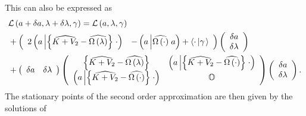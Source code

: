 \documentclass[aps,preprint]{revtex4}%
\begin{document}
This can also be expressed as
\begin{align}
&  \mathcal{L}\left(  a+\delta a,\lambda+\delta\lambda,\gamma\right)
=\mathcal{L}\left(  a,\lambda,\gamma\right) \nonumber\\
&  +\left(
\begin{array}
[c]{cc}%
2\left(  a\left\vert \left\{  \widehat{K+V_{2}}-\widehat{\Omega\left(
\lambda\right)  }\right\}  \right.  \cdot\right)  & -\left(  a\left\vert
\widehat{\Omega\left(  \cdot\right)  }\right.  a\right)  +\left\langle
\cdot\left\vert \gamma\right.  \right\rangle
\end{array}
\right)  \left(
\begin{array}
[c]{c}%
\delta a\\
\delta\lambda
\end{array}
\right) \nonumber\\
&  +\left(
\begin{array}
[c]{cc}%
\delta a & \delta\lambda
\end{array}
\right)  \left(
\begin{array}
[c]{cc}%
\left\{  \widehat{K+V_{2}}-\widehat{\Omega\left(  \lambda\right)  }\right\}  &
\left(  a\left\vert \left\{  \widehat{K+V_{2}}-\widehat{\Omega\left(
\cdot\right)  }\right\}  \right.  \cdot\right) \\
\left(  a\left\vert \left\{  \widehat{K+V_{2}}-\widehat{\Omega\left(
\cdot\right)  }\right\}  \right.  \cdot\right)  & \mathbb{O}%
\end{array}
\right)  \left(
\begin{array}
[c]{c}%
\delta a\\
\delta\lambda
\end{array}
\right)  .
\end{align}
The stationary points of the second order approximation are then given by the
solutions of
\end{document}

